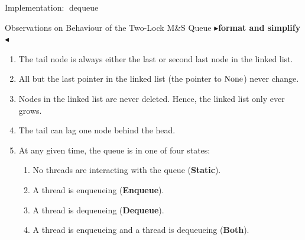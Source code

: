 \documentclass[9pt]{beamer}
\newcommand{\dequeue}{\operatorname{dequeue}}
\newcommand{\msq}{M\&S Queue}
\newcommand{\tlmsq}{Two-Lock \msq{}}
\newcommand{\locinM}[1]{\loc_{#1\_\mathrm{in}}}
\newcommand{\locoutM}[1]{\loc_{#1\_\mathrm{out}}}
\newcommand{\locN}[1]{\loc_{\mathrm{#1}}}
\newcommand{\lochead}{\locN{head}}
\newcommand{\loctail}{\locN{tail}}
\newcommand{\nodeval}{\valB}
\newcommand{\nodevalM}[1]{\nodeval_{#1}}
\newcommand{\node}{x}
\newcommand{\StaticState}{\textbf{Static}\xspace}
\newcommand{\EnqueueState}{\textbf{Enqueue}\xspace}
\newcommand{\DequeueState}{\textbf{Dequeue}\xspace}
\newcommand{\BothState}{\textbf{Both}\xspace}
\newcommand{\todo}[1]{{\color[rgb]{.5,0,0}\textbf{$\blacktriangleright$#1$\blacktriangleleft$}}}
\begin{document}
\begin{frame}[fragile]{Implementation: $\dequeue$}
\begin{center}
{
  }
  \end{center}
\end{frame}

\begin{frame}{Observations on Behaviour of the \tlmsq}
  \todo{format and simplify}
  \begin{enumerate}
    \item\label{TLMSQ:insights:tail} The tail node is always either the last or second last node in the linked list.
    \item\label{TLMSQ:insights:persistent} All but the last pointer in the linked list (the pointer to $\operatorname{None}$) never change.
    \item\label{TLMSQ:insights:oldnodes} Nodes in the linked list are never deleted. Hence, the linked list only ever grows.
    \item\label{TLMSQ:insights:lag} The tail can lag one node behind the head.
    \item\label{TLMSQ:insights:states} At any given time, the queue is in one of four states:
      \begin{enumerate}
        \item\label{TLMSQ:insights:state:static} No threads are interacting with the queue (\StaticState).
        \item\label{TLMSQ:insights:state:enqueue} A thread is enqueueing (\EnqueueState).
        \item\label{TLMSQ:insights:state:dequeue} A thread is dequeueing (\DequeueState).
        \item\label{TLMSQ:insights:state:both} A thread is enqueueing and a thread is dequeueing (\BothState).
      \end{enumerate}
  \end{enumerate}
\end{frame}
\end{document}
